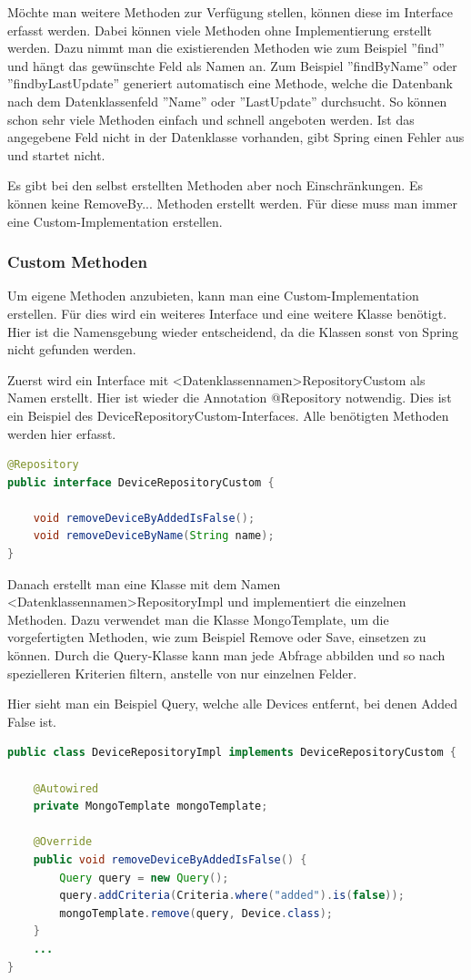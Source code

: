 Möchte man weitere Methoden zur Verfügung stellen, können diese im Interface erfasst werden. Dabei können viele Methoden ohne Implementierung erstellt werden. Dazu nimmt man die existierenden Methoden wie zum Beispiel ''find'' und hängt das gewünschte Feld als Namen an. Zum Beispiel ''findByName'' oder ''findbyLastUpdate'' generiert automatisch eine Methode, welche die Datenbank nach dem Datenklassenfeld ''Name'' oder ''LastUpdate'' durchsucht. So können schon sehr viele Methoden einfach und schnell angeboten werden. Ist das angegebene Feld nicht in der Datenklasse vorhanden, gibt Spring einen Fehler aus und startet nicht.

Es gibt bei den selbst erstellten Methoden aber noch Einschränkungen. Es können keine RemoveBy... Methoden erstellt werden. Für diese muss man immer eine Custom-Implementation erstellen.

\subsubsection{Custom Methoden}
Um eigene Methoden anzubieten, kann man eine Custom-Implementation erstellen. Für dies wird ein weiteres Interface und eine weitere Klasse benötigt. Hier ist die Namensgebung wieder entscheidend, da die Klassen sonst von Spring nicht gefunden werden.

Zuerst wird ein Interface mit <Datenklassennamen>RepositoryCustom als Namen erstellt. Hier ist wieder die Annotation @Repository notwendig. Dies ist ein Beispiel des DeviceRepositoryCustom-Interfaces. Alle benötigten Methoden werden hier erfasst.
\begin{lstlisting}[language=java]
@Repository
public interface DeviceRepositoryCustom {

	void removeDeviceByAddedIsFalse();
	void removeDeviceByName(String name);
}
\end{lstlisting}

Danach erstellt man eine Klasse mit dem Namen <Datenklassennamen>RepositoryImpl und implementiert die einzelnen Methoden. Dazu verwendet man die Klasse MongoTemplate, um die vorgefertigten Methoden, wie zum Beispiel Remove oder Save, einsetzen zu können. Durch die Query-Klasse kann man jede Abfrage abbilden und so nach spezielleren Kriterien filtern, anstelle von nur einzelnen Felder.
\newpage

Hier sieht man ein Beispiel Query, welche alle Devices entfernt, bei denen Added False ist. 
\begin{lstlisting}[language=java]
public class DeviceRepositoryImpl implements DeviceRepositoryCustom {

	@Autowired
	private MongoTemplate mongoTemplate;

	@Override
	public void removeDeviceByAddedIsFalse() {
		Query query = new Query();
		query.addCriteria(Criteria.where("added").is(false));
		mongoTemplate.remove(query, Device.class);
	}
	...
}
\end{lstlisting}
